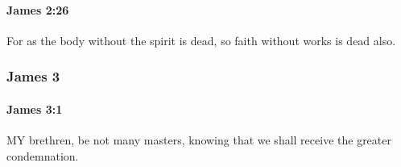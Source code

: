 		\paragraph{James 2:26} %
			\label{JAMES-2-26}

			For as the body without the spirit is dead, so faith without works is dead also.

			\begin{framed}
			\scriptsize
				\begin{compactdesc}
					\item[SBLG] 
				\end{compactdesc}
			\end{framed}

	\subsubsection{James 3} %
		\label{JAMES-3}
		
		\paragraph{James 3:1} %
			\label{JAMES-3-1}

			MY brethren, be not many masters, knowing that we shall receive the greater condemnation.

